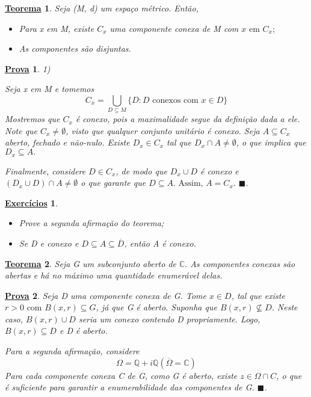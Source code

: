 \documentclass{article}
\newtheorem*{theorem*}{\underline{Teorema}}
\newtheorem*{proof*}{\underline{Prova}}
\newtheorem*{exer*}{\underline{Exerc\'icios}}
\renewcommand\qedsymbol{$\blacksquare$}
\begin{document}
\begin{theorem*}
  Seja (M, d) um espa\c co m\'etrico. Ent\~ao,
 \begin{itemize}
   \item[1)] Para x em M, existe $C _{x}$ uma componente conexa de M com $x\text{ em }C _{x}; $
   \item[2)] As componentes s\~ao disjuntas.
 \end{itemize}
\end{theorem*}
\begin{proof*}
  1) \par Seja x em M e tomemos
  $$
  C _{x} = \bigcup _{D\subseteq{M}} \{D: D \text{ conexos com } x\in{D}\}
  $$
  Mostremos que $C _{x}$ \'e conexo, pois a maximalidade segue da defini\c c\~ao dada a ele. Note que $C _{x}\neq\emptyset$, visto que
qualquer conjunto unit\'ario \'e conexo. Seja $A\subseteq{C _{x}}$ aberto, fechado e n\~ao-nulo. Existe $D _{x}\in C _{x}$ tal
que $D _{x}\cap{A}\neq\emptyset$, o que implica que $D _{x}\subseteq{A}.$

Finalmente, considere $D\in C _{x}$, de modo que $D _{x}\cup{D}$ \'e conexo e $(D _{x}\cup{D})\cap{A}\neq\emptyset$ o que garante
que $D\subseteq{A}. \text{ Assim, } A = C _{x}.$
\qedsymbol.
\end{proof*}
\begin{exer*}
 \begin{itemize}
  \item[1)] Prove a segunda afirma\c c\~ao do teorema;
  \item[2)] Se D e conexo e $D\subseteq{A}\subseteq{\overline{D}}$, ent\~ao A \'e conexo.
 \end{itemize}
\end{exer*}

\begin{theorem*}
  Seja G um subconjunto aberto de $\mathbb{C}.$ As componentes conexas s\~ao abertas e h\'a no m\'aximo uma quantidade enumer\'avel
delas.
\end{theorem*}
\begin{proof*}
  Seja D uma componente conexa de G. Tome $x\in{D}$, tal que existe $r > 0 \text{ com } B(x, r)\subseteq{G}$, j\'a que G \'e aberto.
Suponha que $B(x, r)\not\subseteq{D}.$ Neste caso, $B(x, r)\cup{D}$ seria um conexo contendo D propriamente. Logo, 
$B(x, r)\subseteq{D}$ e D \'e aberto. 

  Para a segunda afirma\c c\~ao, considere 
  $$
  \Omega = \mathbb{Q} + i\mathbb{Q} (\overline{\Omega} = \mathbb{C})
  $$  
  Para cada componente conexa C de G, como G \'e aberto, existe $z\in{\Omega\cap{C}}$, o que \'e suficiente para garantir a enumerabilidade
das componentes de G.
\qedsymbol.
\end{proof*}
\end{document}
